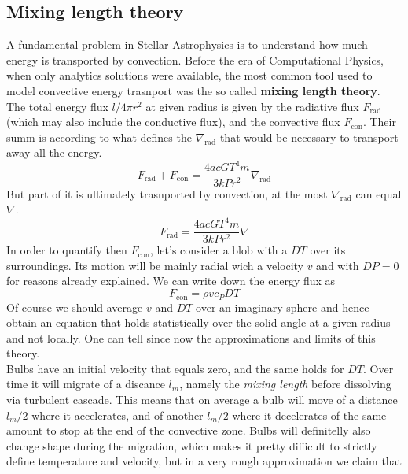 \documentclass[11pt]{article}
\numberwithin{equation}{section}
\begin{document}
\subsection{Mixing length theory}
A fundamental problem in Stellar Astrophysics is to understand how much energy is transported by convection. Before the era of Computational Physics, when only analytics solutions were available, the most common tool used to model convective energy trasnport was the so called \textbf{mixing length theory}. \\
The total energy flux $l/4 \pi r^2$ at given radius is given by the radiative flux $F_{\mathrm{rad}}$ (which may also include the conductive flux), and the convective flux $F_{\mathrm{con}}$. Their summ is according to \label{nablarad} what defines the $\nabla_{\mathrm{rad}}$ that would be necessary to transport away all the energy.
\begin{equation}\label{7.1}
F_{\mathrm{rad}}+ F_{\mathrm{con}}= \frac{4 a c G T^4 m }{3 k P r^2} \nabla_{\mathrm{rad}}
\end{equation}
But part of it is ultimately trasnported by convection, at the most $\nabla_{\mathrm{rad}}$ can equal $\nabla$. 
\begin{equation}\label{7.2}
F_{\mathrm{rad}}= \frac{4 a c G T^4 m}{3 k P r^2} \nabla
\end{equation}
In order to quantify then $F_{\mathrm{con}}$, let's consider a blob with a $DT$ over its surroundings. Its motion will be mainly radial wich a velocity $v$ and with $DP=0$ for reasons already explained. We can write down the energy flux as
\begin{equation}\label{fconv}
	F_{\mathrm{con}}=\rho  v  c_P  DT
\end{equation}
Of course we should average $v$ and $DT$ over an imaginary sphere and hence obtain an equation that holds statistically over the solid angle at a given radius and not locally. One can tell since now the approximations and limits of this theory. \\
Bulbs have an initial velocity that equals zero, and the same holds for $DT$. Over time it will migrate of a discance $l_m$, namely the \textit{mixing length} before dissolving via turbulent cascade. This means that on average a bulb will move of a distance $l_m/2$ where it accelerates, and of another $l_m/2$ where it decelerates of the same amount to stop at the end of the convective zone. Bulbs will definitelly also change shape during the migration, which makes it pretty difficult to strictly define temperature and velocity, but in a very rough approximation we claim that
\end{document}
